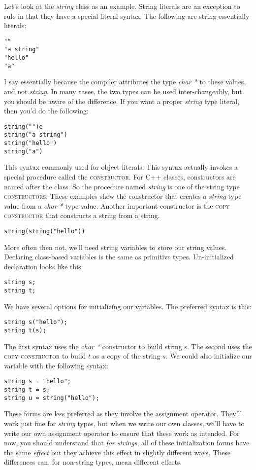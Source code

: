 \documentclass[]{tufte-handout}
\begin{document}
Let's look at the \textit{string} class as an example. String literals are an exception to rule in that they have a special literal syntax.  The following are string essentially literals:
\begin{verbatim}
""
"a string"
"hello"
"a"
\end{verbatim}
I say essentially because the compiler attributes the type \textit{char *} to these values, and not \textit{string}. In many cases, the two types can be used inter-changeably, but you should be aware of the difference. If you want a proper \textit{string} type literal, then you'd do the following:
\begin{verbatim}
string("")e
string("a string")
string("hello")
string("a")
\end{verbatim}
This syntax commonly used for object literals.  This syntax actually invokes a special procedure called the \textsc{constructor}. For C++ classes, constructors are named after the class. So the procedure named \textit{string} is one of the string type \textsc{constructors}.  These examples show the constructor that creates a \textit{string} type value from a \textit{char *} type value.  Another important constructor is the \textsc{copy constructor} that constructs a string from a string.
\begin{verbatim}
string(string("hello"))
\end{verbatim}


More often then not, we'll need string variables to store our string values. Declaring class-based variables is the same as primitive types.  Un-initialized declaration looks like this:
\begin{verbatim}
string s;
string t;
\end{verbatim}
We have several options for initializing our variables.  The preferred syntax is this:
\begin{verbatim}
string s("hello");
string t(s);
\end{verbatim}
The first syntax uses the \textit{char *} constructor to build string s. The second uses the \textsc{copy constructor} to build $t$ as a copy of the string $s$. We could also initialize our variable with the following syntax:
\begin{verbatim}
string s = "hello";
string t = s;
string u = string("hello");
\end{verbatim}
These forms are less preferred as they involve the assignment operator. They'll work just fine for \textit{string} types, but when we write our own classes, we'll have to write our own assignment operator to ensure that these work as intended.  For now, you should understand that \textit{for strings}, all of these initialization forms have the same \textit{effect} but they achieve this effect in slightly different ways.  These differences can, for non-string types, mean different effects.   
\end{document}
